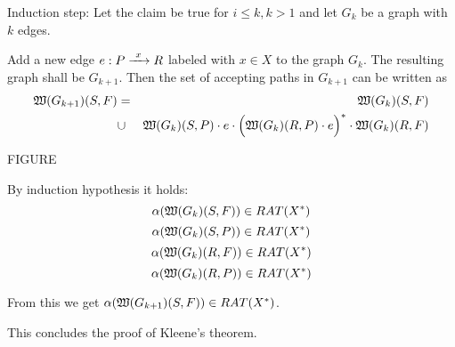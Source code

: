 Induction step: Let the claim be true for $i \leq k, k > 1$ and let $G_k$ be a
graph with $k$ edges.

Add a new edge $e : P \xrightarrow{\ {x}\ } R$ labeled with $x \in X$ to the graph $G_k$. The
resulting graph shall be $G_{k+1}$. Then the set of accepting paths in $G_{k+1}$
can be written as \begin{eqnarray*}
 \mbox{$\mathfrak{W}(G_{k+1})$}(S, F) & = & \mbox{$\mathfrak{W}(G_k)$}(S, F) \\
 & \cup & \mbox{$\mathfrak{W}(G_k)$}(S, P) \cdot e \cdot \Big( \mbox{$\mathfrak{W}(G_k)$}(R, P) \cdot
 e \Big)^* \cdot \mbox{$\mathfrak{W}(G_k)$}(R, F)
\end{eqnarray*}

FIGURE

By induction hypothesis it holds:
\[ \alpha(\mbox{$\mathfrak{W}(G_k)$}(S, F)) \in RAT(X^*) \]
\[ \alpha(\mbox{$\mathfrak{W}(G_k)$}(S, P)) \in RAT(X^*) \]
\[ \alpha(\mbox{$\mathfrak{W}(G_k)$}(R, F)) \in RAT(X^*) \]
\[ \alpha(\mbox{$\mathfrak{W}(G_k)$}(R, P)) \in RAT(X^*) \]

From this we get $\alpha(\mbox{$\mathfrak{W}(G_{k+1})$}(S, F)) \in RAT(X^*)$.

This concludes the proof of Kleene's theorem.



























